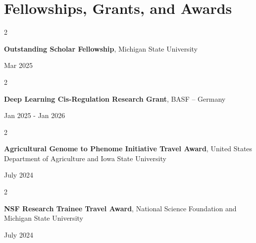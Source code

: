 \documentclass[10pt, letterpaper]{article}
\newenvironment{twocolentry}[2][]{
    \onecolentry
    \def\secondColumn{#2}
    \setcolumnwidth{\fill, 4.5 cm}
    \begin{paracol}{2}
}{
    \switchcolumn \raggedleft \secondColumn
    \end{paracol}
    \endonecolentry
} %
\begin{document}
    \section{Fellowships, Grants, and Awards}




        \begin{samepage} 
            \begin{twocolentry}{
                Mar 2025
                }
                \textbf{Outstanding Scholar Fellowship}, Michigan State University
            \end{twocolentry}
        \end{samepage}  


        \vspace{0.2 cm}

        
        \begin{samepage} 
            \begin{twocolentry}{
                Jan 2025 - Jan 2026
                }
                \textbf{Deep Learning Cis-Regulation Research Grant}, BASF -- Germany
            \end{twocolentry}
        \end{samepage}  


        \vspace{0.2 cm}

        
        \begin{samepage} 
            \begin{twocolentry}{
                July 2024
                }
                \textbf{Agricultural Genome to Phenome Initiative Travel Award}, United States Department of Agriculture and Iowa State University
            \end{twocolentry}
        \end{samepage}  


        \vspace{0.2 cm}


        \begin{samepage} 
            \begin{twocolentry}{
                July 2024
                }
                \textbf{NSF Research Trainee Travel Award}, National Science Foundation and Michigan State University
            \end{twocolentry}
        \end{samepage}  


        \vspace{0.2 cm}
\end{document}
